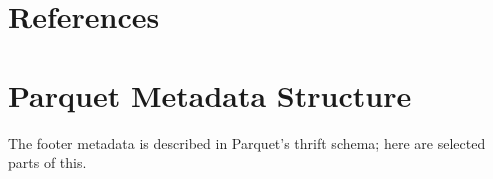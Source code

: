 \documentclass[manuscript]{acmart}
\begin{document}
\section{References}
\label{sec:references}






\appendix{}

\section{Parquet Metadata Structure}
\label{sec:parquet-metadata}

The footer metadata is described in Parquet's thrift schema; here
are selected parts of this.
\end{document}

